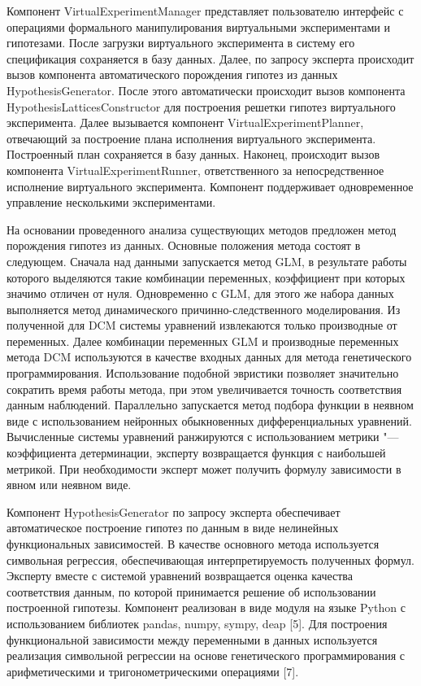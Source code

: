 Компонент VirtualExperimentManager представляет пользователю интерфейс с операциями формального манипулирования 
виртуальными экспериментами и гипотезами. После загрузки виртуального эксперимента в систему его спецификация 
сохраняется в базу данных. Далее, по запросу эксперта происходит вызов компонента автоматического порождения 
гипотез из данных HypothesisGenerator. После этого автоматически происходит вызов компонента 
HypothesisLatticesConstructor для построения решетки гипотез виртуального эксперимента. Далее вызывается компонент 
VirtualExperimentPlanner, отвечающий за построение плана исполнения виртуального эксперимента. Построенный план 
сохраняется в базу данных. Наконец, происходит вызов компонента VirtualExperimentRunner, ответственного за 
непосредственное исполнение виртуального эксперимента. Компонент поддерживает одновременное управление 
несколькими экспериментами.

На основании проведенного анализа существующих методов предложен метод порождения гипотез из данных. Основные 
положения метода состоят в следующем. Сначала над данными запускается метод GLM, в результате работы которого 
выделяются такие комбинации переменных, коэффициент при которых значимо отличен от нуля. Одновременно с GLM, для
 этого же набора данных выполняется метод динамического причинно-следственного моделирования. Из полученной для 
 DCM системы уравнений извлекаются только производные от переменных. Далее комбинации переменных GLM и производные 
 переменных метода DCM используются в качестве входных данных для метода генетического программирования. 
 Использование подобной эвристики позволяет значительно сократить время работы метода, при этом увеличивается 
 точность соответствия данным наблюдений. Параллельно запускается метод подбора функции в неявном виде с использованием 
 нейронных обыкновенных дифференциальных уравнений. Вычисленные системы уравнений ранжируются с использованием 
 метрики "--- коэффициента детерминации, эксперту возвращается функция с наибольшей метрикой. При необходимости 
 эксперт может получить формулу зависимости в явном или неявном виде.

Компонент HypothesisGenerator по запросу эксперта обеспечивает автоматическое построение гипотез по данным в виде 
нелинейных функциональных зависимостей. В качестве основного метода используется символьная регрессия, обеспечивающая 
интерпретируемость полученных формул. Эксперту вместе с системой уравнений возвращается оценка качества соответствия 
данным, по которой принимается решение об использовании построенной гипотезы. Компонент реализован в виде модуля на 
языке Python с использованием библиотек pandas, numpy, sympy, deap [5]. Для построения функциональной зависимости 
между переменными в данных используется реализация символьной регрессии на основе генетического программирования 
с арифметическими и тригонометрическими операциями [7]. 

